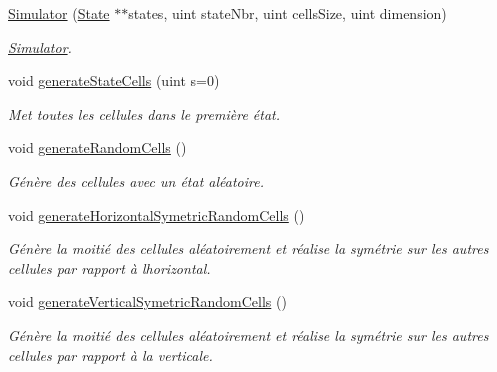 \begin{DoxyCompactItemize}
\item 
\mbox{\hyperlink{class_simulator_ad94338259f0facaa7d94a41437406ad5}{Simulator}} (\mbox{\hyperlink{class_state}{State}} $\ast$$\ast$states, uint state\+Nbr, uint cells\+Size, uint dimension)
\begin{DoxyCompactList}\small\item\em \mbox{\hyperlink{class_simulator}{Simulator}}. \end{DoxyCompactList}\item 
void \mbox{\hyperlink{class_simulator_a785fdbb8538c31951d109e09cea3c575}{generate\+State\+Cells}} (uint s=0)
\begin{DoxyCompactList}\small\item\em Met toutes les cellules dans le première état. \end{DoxyCompactList}\item 
\mbox{\label{class_simulator_a6fed4c04056853bba67d7c64a669e8ed}} 
void \mbox{\hyperlink{class_simulator_a6fed4c04056853bba67d7c64a669e8ed}{generate\+Random\+Cells}} ()
\begin{DoxyCompactList}\small\item\em Génère des cellules avec un état aléatoire. \end{DoxyCompactList}\item 
\mbox{\label{class_simulator_a29a3f95d77323193feddea1483756284}} 
void \mbox{\hyperlink{class_simulator_a29a3f95d77323193feddea1483756284}{generate\+Horizontal\+Symetric\+Random\+Cells}} ()
\begin{DoxyCompactList}\small\item\em Génère la moitié des cellules aléatoirement et réalise la symétrie sur les autres cellules par rapport à l\textquotesingle{}horizontal. \end{DoxyCompactList}\item 
\mbox{\label{class_simulator_adba80b9dda736593d4b5aae2fb01f903}} 
void \mbox{\hyperlink{class_simulator_adba80b9dda736593d4b5aae2fb01f903}{generate\+Vertical\+Symetric\+Random\+Cells}} ()
\begin{DoxyCompactList}\small\item\em Génère la moitié des cellules aléatoirement et réalise la symétrie sur les autres cellules par rapport à la verticale. \end{DoxyCompactList}\item 
$$
\end{DoxyCompactItemize}
